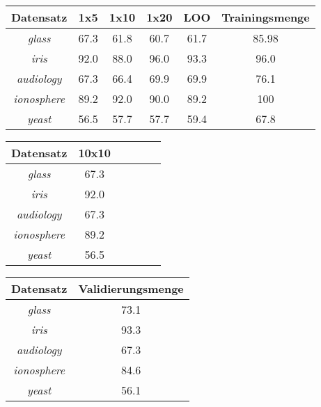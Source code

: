 

\begin{tabular}{c|c|c|c|c|c}
				Datensatz         & 1x5  & 1x10 & 1x20 & LOO  & Trainingsmenge   \\ \hline
				\emph{glass}      & 67.3 & 61.8 & 60.7 & 61.7 & 85.98   \\ \hline
				\emph{iris}       & 92.0 & 88.0 & 96.0 & 93.3 & 96.0    \\ \hline
				\emph{audiology}  & 67.3 & 66.4 & 69.9 & 69.9 & 76.1    \\ \hline
				\emph{ionosphere} & 89.2 & 92.0 & 90.0 & 89.2 & 100   \\ \hline
				\emph{yeast}      & 56.5 & 57.7 & 57.7 & 59.4 & 67.8   \\ \hline
\end{tabular}



\begin{tabular}{c|c|c|c|c|c}
				Datensatz         & 10x10    \\ \hline
				\emph{glass}      & 67.3     \\ \hline
				\emph{iris}       & 92.0     \\ \hline
				\emph{audiology}  & 67.3     \\ \hline
				\emph{ionosphere} & 89.2     \\ \hline
				\emph{yeast}      & 56.5     \\ \hline
\end{tabular}


\begin{tabular}{c|c}
				Datensatz         & Validierungsmenge    \\ \hline
				\emph{glass}      & 73.1     \\ \hline
				\emph{iris}       & 93.3     \\ \hline
				\emph{audiology}  & 67.3   \\ \hline
				\emph{ionosphere} & 84.6   \\ \hline
				\emph{yeast}      & 56.1 \\ \hline
\end{tabular}

